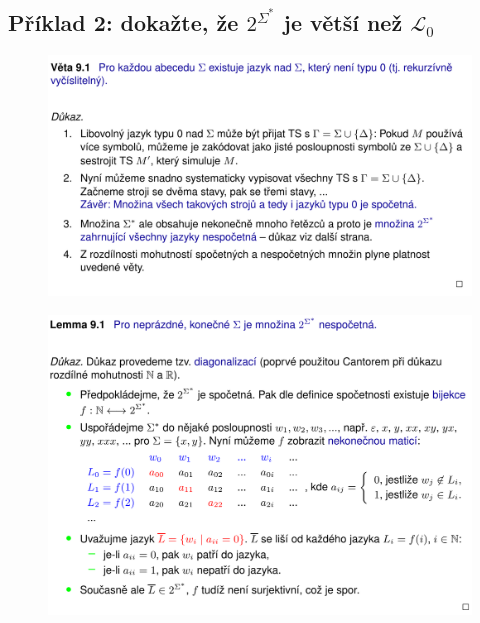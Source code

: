 \subsection*{Příklad 2: dokažte, že $2^{\Sigma^*}$ je větší než $\mathcal{L}_0$}



\begin{figure}[H]
    \centering
    \includegraphics[width=1\linewidth]{diagonalizace_pr2_p1.pdf}
\end{figure}

\begin{figure}[H]
    \centering
    \includegraphics[width=1\linewidth]{diagonalizace_pr2_p2.pdf}
\end{figure}

